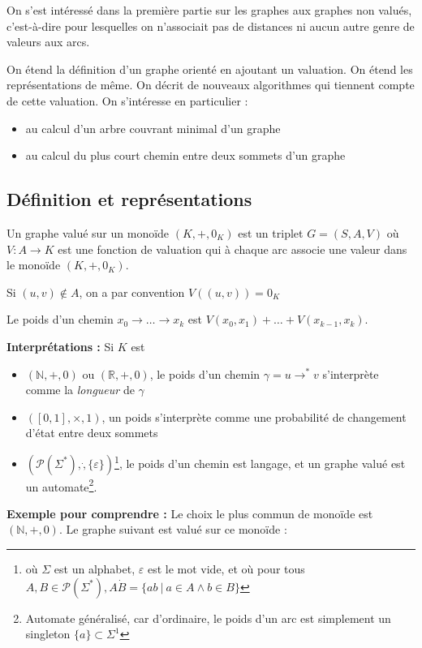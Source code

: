 \documentclass[../../../main.tex]{subfiles}
\begin{document}
On s'est intéressé dans la première partie sur les graphes aux graphes non valués, c'est-à-dire pour lesquelles on n'associait pas de distances ni aucun autre genre de valeurs aux arcs.

On étend la définition d'un graphe orienté en ajoutant un valuation. On étend les représentations de même. On décrit de nouveaux algorithmes qui tiennent compte de cette valuation. On s'intéresse en particulier :
\begin{itemize}
	\item au calcul d'un arbre couvrant minimal d'un graphe
	\item au calcul du plus court chemin entre deux sommets d'un graphe
\end{itemize}
\subsection{Définition et représentations}
 {
	Un graphe valué sur un monoïde $(K, +, 0_K)$ est un triplet $G = (S, A, V)$ où $V:A\rightarrow K$ est une fonction de valuation qui à chaque arc associe une valeur dans le monoïde $(K, +, 0_K)$.

	Si $(u, v)\not\in A$, on a par convention $V((u, v)) = 0_K$\newline

	Le poids d'un chemin $x_0\rightarrow \dots \rightarrow x_k$ est $V(x_0, x_1)+ \dots + V(x_{k-1}, x_k)$.
}
\textbf{Interprétations :} Si $K$ est
\begin{itemize}
	\item $(\mathbb{N}, +, 0)$ ou $(\mathbb{R}, +, 0)$, le poids d'un chemin $\gamma = u\rightarrow^*v$ s'interprète comme la \textit{longueur} de $\gamma$
	\item $([0, 1], \times, 1)$, un poids s'interprète comme une probabilité de changement d'état entre deux sommets
	\item $(\mathcal{P}(\Sigma^*), \dot, \{\varepsilon\})$\footnote{où $\Sigma$ est un alphabet, $\varepsilon$ est le mot vide, et où pour tous $A, B\in \mathcal{P}(\Sigma^*), A\dot B = \{ab\ |\ a\in A \wedge b\in B\}$}, le poids d'un chemin est langage, et un graphe valué est un automate\footnote{Automate généralisé, car d'ordinaire, le poids d'un arc est simplement un singleton $\{a\}\subset \Sigma^1$}.
\end{itemize}
\textbf{Exemple pour comprendre :} Le choix le plus commun de monoïde est $(\mathbb{N}, +, 0)$.\newline
Le graphe suivant est valué sur ce monoïde :
\end{document}
